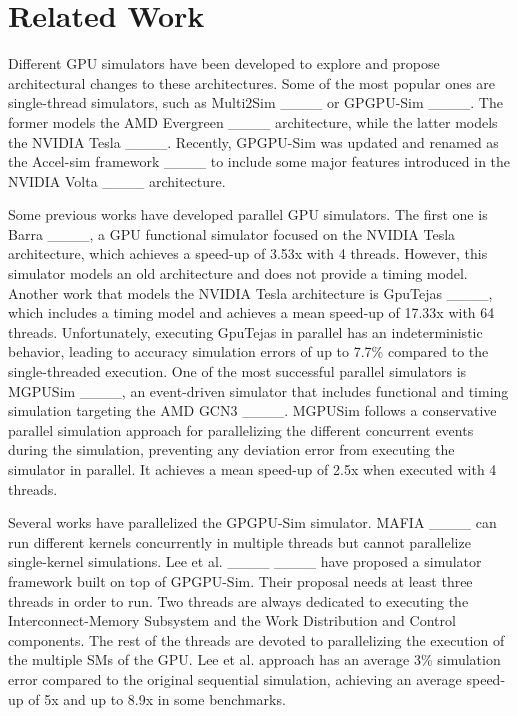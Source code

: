 \section{Related Work}
\label{sec:relatedwork}

\par
Different GPU simulators have been developed to explore and propose architectural changes to these architectures. Some of the most popular ones are single-thread simulators, such as Multi2Sim ____ or GPGPU-Sim ____. The former models the AMD Evergreen ____ architecture, while the latter models the NVIDIA Tesla ____. Recently, GPGPU-Sim was updated and renamed as the Accel-sim framework ____ to include some major features introduced in the NVIDIA Volta ____ architecture.

\par
Some previous works have developed parallel GPU simulators. The first one is Barra ____, a GPU functional simulator focused on the NVIDIA Tesla architecture, which achieves a speed-up of 3.53x with 4 threads. However, this simulator models an old architecture and does not provide a timing model. Another work that models the NVIDIA Tesla architecture is GpuTejas ____, which includes a timing model and achieves a mean speed-up of 17.33x with 64 threads. Unfortunately, executing GpuTejas in parallel has an indeterministic behavior, leading to accuracy simulation errors of up to 7.7\% compared to the single-threaded execution. One of the most successful parallel simulators is MGPUSim ____, an event-driven simulator that includes functional and timing simulation targeting the AMD GCN3 ____. MGPUSim follows a conservative parallel simulation approach for parallelizing the different concurrent events during the simulation, preventing any deviation error from executing the simulator in parallel. It achieves a mean speed-up of 2.5x when executed with 4 threads.

\par
Several works have parallelized the GPGPU-Sim simulator. MAFIA ____ can run different kernels concurrently in multiple threads but cannot parallelize single-kernel simulations. Lee et al. ____ ____ have proposed a simulator framework built on top of GPGPU-Sim. Their proposal needs at least three threads in order to run. Two threads are always dedicated to executing the Interconnect-Memory Subsystem and the Work Distribution and Control components. The rest of the threads are devoted to parallelizing the execution of the multiple SMs of the GPU. Lee et al. approach has an average 3\% simulation error compared to the original sequential simulation, achieving an average speed-up of 5x and up to 8.9x in some benchmarks.

